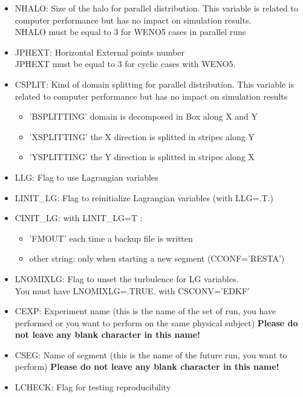 \begin{itemize}
\item
NHALO: Size of the halo for parallel distribution.
This variable is related to computer performance but has no
impact on simulation results.\\
NHALO must be equal to 3 for WENO5 cases in parallel runs

\item
JPHEXT:  Horizontal External points number\\
JPHEXT must be equal to 3 for cyclic cases with WENO5.

\item
CSPLIT: Kind of domain splitting for parallel distribution.
This variable is related to computer performance but has no
impact on simulation results

\begin{itemize}
\item 'BSPLITTING' domain is decomposed in Box along X and Y
\item 'XSPLITTING' the X direction is splitted in stripes along Y
\item 'YSPLITTING' the Y direction is splitted in stripes along X
\end{itemize}

\item
LLG: Flag to use Lagrangian variables

\item
LINIT\_LG: Flag to reinitialize  Lagrangian variables (with LLG=.T.)

\item
CINIT\_LG:  with LINIT\_LG=T :
\begin{itemize}
\item 'FMOUT' each time a backup file is written
\item other string: only when starting a new segment (CCONF='RESTA')
\end{itemize}

\item
LNOMIXLG: Flag to unset the turbulence for LG variables.\\
 You must have LNOMIXLG=.TRUE. with CSCONV='EDKF'

\item
CEXP: Experiment name (this is the name of the set of run, you have performed
or you want to perform on the same physical subject) 
{\bf Please do not leave any blank character in this name!}

\item
CSEG:  Name of segment (this is the name of the future run, you want to perform)
{\bf Please do not leave any blank character in this name!}

\item
LCHECK:   Flag for testing reproducibility


\end{itemize}

